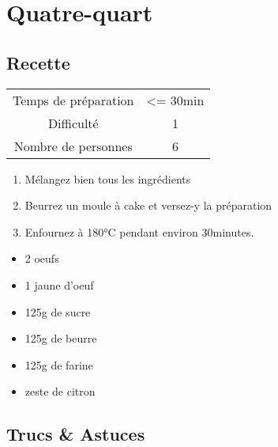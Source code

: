 \newpage
\section{Quatre-quart}
    \label{sec:Quatre-quart}
    \subsection{Recette}
    \vspace{1cm}


    \begin{center}
        \begin{tabular}{c|c}
            Temps de préparation & <= 30min \\
            Difficulté & 1 \\
            Nombre de personnes & 6 
        \end{tabular}
    \end{center}{}

    \vspace{1cm}
    \hline
    \vspace{1cm}

    \begin{minipage}{.7\textwidth}
        \begin{enumerate}
            \item Mélangez bien tous les ingrédients
	    \item Beurrez un moule à cake et versez-y la préparation
	    \item Enfournez à 180°C pendant environ 30minutes.

        \end{enumerate}
    \end{minipage}
    \begin{minipage}{.3\textwidth}
        \begin{flushleft}
        \begin{itemize}
            \item 2 oeufs
	    \item 1 jaune d'oeuf
	    \item 125g de sucre
	    \item 125g de beurre
	    \item 125g de farine
	    \item zeste de citron

        \end{itemize}
        \end{flushleft}
    \end{minipage}
    
    \vspace{1cm}
    \hline
    \vspace{1cm}
    
    \subsection{Trucs \& Astuces}
        
